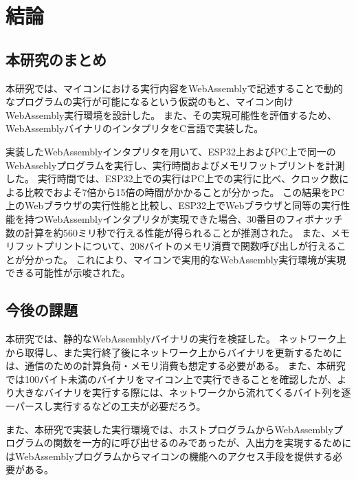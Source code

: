 \chapter{結論}
\label{chap:conclusion}

\section{本研究のまとめ}
\label{section:conclusion}

本研究では、マイコンにおける実行内容をWebAssemblyで記述することで動的なプログラムの実行が可能になるという仮説のもと、マイコン向けWebAssembly実行環境を設計した。
また、その実現可能性を評価するため、WebAssemblyバイナリのインタプリタをC言語で実装した。

実装したWebAssemblyインタプリタを用いて、ESP32上およびPC上で同一のWebAsseblyプログラムを実行し、実行時間およびメモリフットプリントを計測した。
実行時間では、ESP32上での実行はPC上での実行に比べ、クロック数による比較でおよそ7倍から15倍の時間がかかることが分かった。
この結果をPC上のWebブラウザの実行性能と比較し、ESP32上でWebブラウザと同等の実行性能を持つWebAssemblyインタプリタが実現できた場合、30番目のフィボナッチ数の計算を約560ミリ秒で行える性能が得られることが推測された。
また、メモリフットプリントについて、208バイトのメモリ消費で関数呼び出しが行えることが分かった。
これにより、マイコンで実用的なWebAssembly実行環境が実現できる可能性が示唆された。

\section{今後の課題}

本研究では、静的なWebAssemblyバイナリの実行を検証した。
ネットワーク上から取得し、また実行終了後にネットワーク上からバイナリを更新するためには、通信のための計算負荷・メモリ消費も想定する必要がある。
また、本研究では100バイト未満のバイナリをマイコン上で実行できることを確認したが、より大きなバイナリを実行する際には、ネットワークから流れてくるバイト列を逐一パースし実行するなどの工夫が必要だろう。

また、本研究で実装した実行環境では、ホストプログラムからWebAssemblyプログラムの関数を一方的に呼び出せるのみであったが、入出力を実現するためにはWebAssemblyプログラムからマイコンの機能へのアクセス手段を提供する必要がある。
